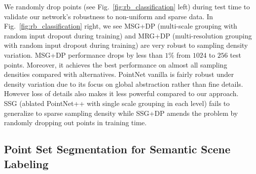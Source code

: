 We randomly drop points (see Fig.~\ref{fig:rb_classification} left) during test time to validate our network's robustness to non-uniform and sparse data.
In Fig.~\ref{fig:rb_classification} right, we see MSG+DP (multi-scale grouping with random input dropout during training) and MRG+DP (multi-resolution grouping with random input dropout during training) are very robust to sampling density variation. MSG+DP performance drops by less than $1\%$ from $1024$ to $256$ test points. Moreover, it achieves the best performance on almost all sampling densities compared with alternatives.
PointNet vanilla \cite{qi2016pointnet} is fairly robust under density variation due to its focus on global abstraction rather than fine details. However loss of details also makes it less powerful compared to our approach.
SSG (ablated PointNet++ with single scale grouping in each level) fails to generalize to sparse sampling density while SSG+DP amends the problem by randomly dropping out points in training time.

\vspace{-0.3cm}
\subsection{Point Set Segmentation for Semantic Scene Labeling}

